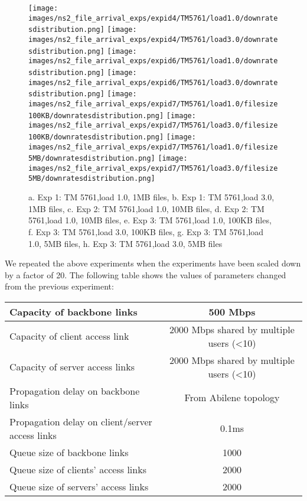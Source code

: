 \begin{figure}[h]

\texttt{[image: images/ns2\_file\_arrival\_exps/expid4/TM5761/load1.0/downratesdistribution.png]}
\texttt{[image: images/ns2\_file\_arrival\_exps/expid4/TM5761/load3.0/downratesdistribution.png]}
\texttt{[image: images/ns2\_file\_arrival\_exps/expid6/TM5761/load1.0/downratesdistribution.png]}
\texttt{[image: images/ns2\_file\_arrival\_exps/expid6/TM5761/load3.0/downratesdistribution.png]}
\texttt{[image: images/ns2\_file\_arrival\_exps/expid7/TM5761/load1.0/filesize100KB/downratesdistribution.png]}
\texttt{[image: images/ns2\_file\_arrival\_exps/expid7/TM5761/load3.0/filesize100KB/downratesdistribution.png]}
\texttt{[image: images/ns2\_file\_arrival\_exps/expid7/TM5761/load1.0/filesize5MB/downratesdistribution.png]}
\texttt{[image: images/ns2\_file\_arrival\_exps/expid7/TM5761/load3.0/filesize5MB/downratesdistribution.png]}

\caption{a. Exp 1: TM 5761,load 1.0, 1MB files, b. Exp 1: TM 5761,load 3.0, 1MB files, c. Exp 2: TM 5761,load 1.0, 10MB files, d. Exp 2: TM 5761,load 1.0, 10MB files, e. Exp 3: TM 5761,load 1.0, 100KB files, f. Exp 3: TM 5761,load 3.0, 100KB files, g. Exp 3: TM 5761,load 1.0, 5MB files, h. Exp 3: TM 5761,load 3.0, 5MB files}

\label{ x1}
\end{figure}


We repeated the above experiments when the experiments have been scaled down by a factor of 20. The following table shows the values of parameters changed from the previous experiment:

\begin{center}
  \begin{tabular}{| l | c | }
    \hline
Capacity of backbone links & 500 Mbps\\ \hline
Capacity of client access link & 2000 Mbps shared by multiple users (<10) \\ \hline
Capacity of server access links & 2000 Mbps shared by multiple users (<10) \\ \hline
Propagation delay on backbone links & From Abilene topology\\ \hline
Propagation delay on client/server access links & 0.1ms\\ \hline
Queue size of backbone links & 1000\\ \hline
Queue size of clients' access links & 2000\\ \hline
Queue size of servers' access links & 2000\\ \hline
    \hline
  \end{tabular}
\end{center}


